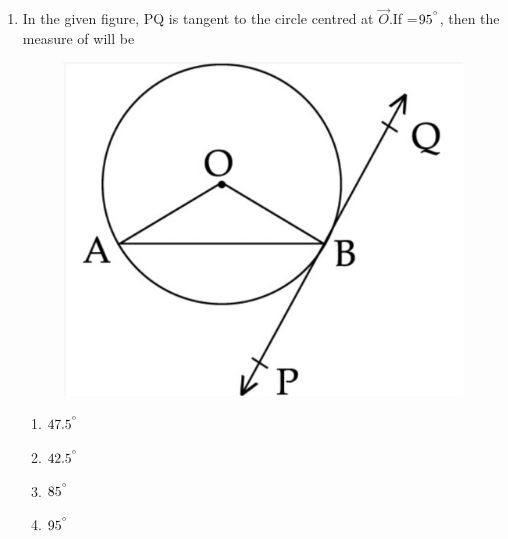 \documentclass{article}
\begin{document}
\begin{enumerate}
	\item In the given figure, PQ is tangent to the circle centred at $\vec{O}$.If =$95^{\degree}$, then the measure of  will be
		\begin{figure}[h]
		\centering
	\includegraphics[width=0.3\columnwidth]{fig1.jpg}
		
\end{figure}
			\begin{enumerate}
				\item $47.5^{\degree}$
				\item $42.5^{\degree}$
				\item $85^{\degree}$
				\item $95^{\degree}$
		\end{enumerate}  


\end{enumerate}
\end{document}
